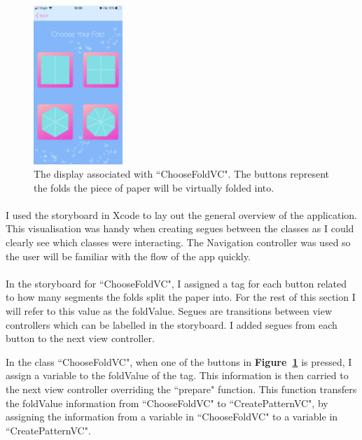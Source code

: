\documentclass[11pt]{article}
\begin{document}
    \begin{figure}
                        \centering
                        \includegraphics[width=0.3\textwidth]{KiriZen/chooseFold}
                        \caption{The display associated with ``ChooseFoldVC". The buttons represent the folds the piece of paper will be virtually folded into.}
                        \label{fig:kiriZen-chooseFold}
                    \end{figure}
    

    \paragraph{}
    I used the storyboard in Xcode to lay out the general overview of the application. This visualisation was handy when creating segues between the classes as I could clearly see which classes were interacting. The Navigation controller was used so the user will be familiar with the flow of the app quickly.

        \paragraph{}
            In the storyboard for ``ChooseFoldVC", I assigned a tag for each button related to how many segments the folds split the paper into. For the rest of this section I will refer to this value as the foldValue. Segues are transitions between view controllers which can be labelled in the storyboard. I added segues from each button to the next view controller.
                    
            In the class ``ChooseFoldVC", when one of the buttons in \textbf{Figure~\ref{fig:kiriZen-chooseFold}} is pressed, I assign a variable to the foldValue of the tag. This information is then carried to the next view controller overriding the ``prepare" function. This function transfers the foldValue information from ``ChooseFoldVC" to ``CreatePatternVC", by assigning the information from a variable in ``ChooseFoldVC" to a variable in ``CreatePatternVC".
                    
\end{document}
